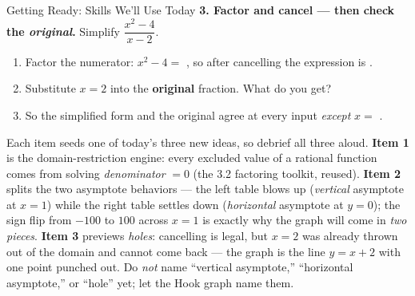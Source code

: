 \documentclass[10pt]{article}
\begin{document}
\begin{notesbox}{Getting Ready: Skills We'll Use Today}
\vspace{4pt}
\textbf{3. Factor and cancel --- then check the \emph{original}.} Simplify
$\dfrac{x^2-4}{x-2}$.
\begin{enumerate}[label=(\alph*), leftmargin=2.1em, itemsep=3pt]
  \item Factor the numerator: $x^2-4=$ , \; so after cancelling the expression is
        .
  \item Substitute $x=2$ into the \textbf{original} fraction. What do you get?
  \item So the simplified form and the original agree at every input \emph{except}
        $x=$ .
\end{enumerate}

\end{notesbox}

\begin{teachernote}
Each item seeds one of today's three new ideas, so debrief all three aloud.
\textbf{Item 1} is the domain-restriction engine: every excluded value of a rational function comes
from solving \emph{denominator} $=0$ (the 3.2 factoring toolkit, reused). \textbf{Item 2} splits the
two asymptote behaviors --- the left table blows up (\emph{vertical} asymptote at $x=1$) while the
right table settles down (\emph{horizontal} asymptote at $y=0$); the sign flip from $-100$ to $100$
across $x=1$ is exactly why the graph will come in \emph{two pieces}. \textbf{Item 3} previews
\emph{holes}: cancelling is legal, but $x=2$ was already thrown out of the domain and cannot come
back --- the graph is the line $y=x+2$ with one point punched out. Do \emph{not} name ``vertical
asymptote,'' ``horizontal asymptote,'' or ``hole'' yet; let the Hook graph name them.
\end{teachernote}
\end{document}
